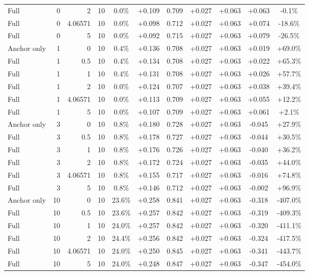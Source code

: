 \begin{table}[htbp]
\begin{tabular}{lrrrccccccc}
Full & 0 & 2 & 10 & 0.0\% & +0.109 & 0.709 & +0.027 & +0.063 & +0.063 & -0.1\% \\
Full & 0 & 4.06571 & 10 & 0.0\% & +0.098 & 0.712 & +0.027 & +0.063 & +0.074 & -18.6\% \\
Full & 0 & 5 & 10 & 0.0\% & +0.092 & 0.715 & +0.027 & +0.063 & +0.079 & -26.5\% \\
Anchor only & 1 & 0 & 10 & 0.4\% & +0.136 & 0.708 & +0.027 & +0.063 & +0.019 & +69.0\% \\
Full & 1 & 0.5 & 10 & 0.4\% & +0.134 & 0.708 & +0.027 & +0.063 & +0.022 & +65.3\% \\
Full & 1 & 1 & 10 & 0.4\% & +0.131 & 0.708 & +0.027 & +0.063 & +0.026 & +57.7\% \\
Full & 1 & 2 & 10 & 0.0\% & +0.124 & 0.707 & +0.027 & +0.063 & +0.038 & +39.4\% \\
Full & 1 & 4.06571 & 10 & 0.0\% & +0.113 & 0.709 & +0.027 & +0.063 & +0.055 & +12.2\% \\
Full & 1 & 5 & 10 & 0.0\% & +0.107 & 0.709 & +0.027 & +0.063 & +0.061 & +2.1\% \\
Anchor only & 3 & 0 & 10 & 0.8\% & +0.180 & 0.728 & +0.027 & +0.063 & -0.045 & +27.9\% \\
Full & 3 & 0.5 & 10 & 0.8\% & +0.178 & 0.727 & +0.027 & +0.063 & -0.044 & +30.5\% \\
Full & 3 & 1 & 10 & 0.8\% & +0.176 & 0.726 & +0.027 & +0.063 & -0.040 & +36.2\% \\
Full & 3 & 2 & 10 & 0.8\% & +0.172 & 0.724 & +0.027 & +0.063 & -0.035 & +44.0\% \\
Full & 3 & 4.06571 & 10 & 0.8\% & +0.155 & 0.717 & +0.027 & +0.063 & -0.016 & +74.8\% \\
Full & 3 & 5 & 10 & 0.8\% & +0.146 & 0.712 & +0.027 & +0.063 & -0.002 & +96.9\% \\
Anchor only & 10 & 0 & 10 & 23.6\% & +0.258 & 0.841 & +0.027 & +0.063 & -0.318 & -407.0\% \\
Full & 10 & 0.5 & 10 & 23.6\% & +0.257 & 0.842 & +0.027 & +0.063 & -0.319 & -409.3\% \\
Full & 10 & 1 & 10 & 24.0\% & +0.257 & 0.842 & +0.027 & +0.063 & -0.320 & -411.1\% \\
Full & 10 & 2 & 10 & 24.4\% & +0.256 & 0.842 & +0.027 & +0.063 & -0.324 & -417.5\% \\
Full & 10 & 4.06571 & 10 & 24.0\% & +0.250 & 0.845 & +0.027 & +0.063 & -0.341 & -443.7\% \\
Full & 10 & 5 & 10 & 24.0\% & +0.248 & 0.847 & +0.027 & +0.063 & -0.347 & -454.0\% \\

\end{tabular}
\end{table}
